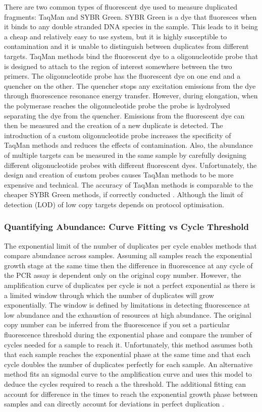\documentclass[../main.tex]{subfiles}
\begin{document}
There are two common types of fluorescent dye used to measure duplicated fragments: TaqMan and SYBR Green.
SYBR Green is a dye that fluoresces when it binds to any double stranded DNA species in the sample.
This leads to it being a cheap and relatively easy to use system, but it is highly susceptible to contamination and it is unable to distinguish between duplicates from different targets. 
TaqMan methods bind the fluorescent dye to a oligonucleotide probe that is designed to attach to the region of interest somewhere between the two primers. 
The oligonucleotide probe has the fluorescent dye on one end and a quencher on the other.
The quencher stops any excitation emissions from the dye through fluorescence resonance energy transfer. 
However, during elongation, when the polymerase reaches the oligonucleotide probe the probe is hydrolysed separating the dye from the quencher.
Emissions from the fluorescent dye can then be measured and the creation of a new duplicate is detected. 
The introduction of a custom oligonucleotide probe increases the specificity of TaqMan methods and reduces the effects of contamination. 
Also, the abundance of multiple targets can be measured in the same sample by carefully designing different oligonucleotide probes with different fluorescent dyes.
Unfortunately, the design and creation of custom probes causes TaqMan methods to be more expensive and technical. 
The accuracy of TaqMan methods is comparable to the cheaper SYBR Green methods, if correctly conducted \cite{Tajadini2014}.
Although the limit of detection (LOD) of low copy targets depends on protocol optimisation. 

\subsubsection{Quantifying Abundance: Curve Fitting vs Cycle Threshold}

The exponential limit of the number of duplicates per cycle enables methods that compare abundance across samples. 
Assuming all samples reach the exponential growth stage at the same time then the difference in fluorescence at any cycle of the PCR assay is dependent only on the original copy number. 
However, the amplification curve of duplicates per cycle is not a perfect exponential as there is a limited window through which the number of duplicates will grow exponentially.
The window is defined by limitations in detecting fluorescence at low abundance and the exhaustion of resources at high abundance.
The original copy number can be inferred from the fluorescence if you set a particular fluorescence threshold during the exponential phase and compare the number of cycles needed for a sample to reach it.
Unfortunately, this method assumes both that each sample reaches the exponential phase at the same time and that each cycle doubles the number of duplicates perfectly for each sample. 
An alternative method fits an sigmodal curve to the amplification curve and uses this model to deduce the cycles required to reach a the threshold.
The additional fitting can account for difference in the times to reach the exponential growth phase between samples and can directly account for deviations in perfect duplication \parencite{Swillens2008}. 
\end{document}

